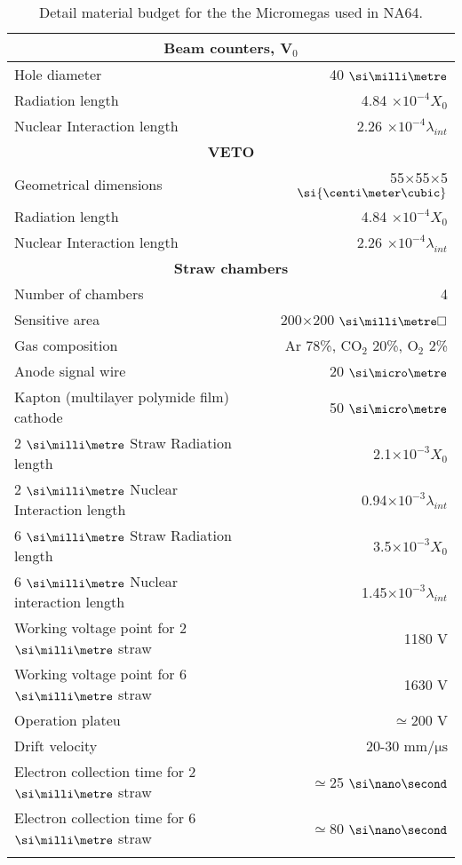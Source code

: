 \begin{longtable}{|l|r|}
  \hline
  \multicolumn{2}{|c|}{\textbf{Beam counters, V$_0$}}\\
  \hline
  Hole diameter & 40 $\mmi$ \\
  Radiation length & 4.84 $\times10^{-4} X_0$ \\
  Nuclear Interaction length & 2.26 $\times 10^{-4} \lambda_{int}$ \\
  \hline
  \multicolumn{2}{|c|}{\textbf{VETO}}\\
  \hline
  Geometrical dimensions & 55$\times$55$\times$5 $\si{\centi\meter\cubic}$ \\
  Radiation length & 4.84 $\times10^{-4} X_0$ \\
  Nuclear Interaction length & 2.26 $\times 10^{-4} \lambda_{int}$ \\
  \hline
  \multicolumn{2}{|c|}{\textbf{Straw chambers}}\\
  \hline
  Number of chambers & 4 \\
  Sensitive area & 200$\times$200 $\mms$ \\
  Gas composition & Ar 78\%, CO$_2$ 20\%, O$_2$ 2\% \\
  Anode signal wire & 20 $\mum$ \\
  Kapton (multilayer polymide film) cathode & 50 $\mum$ \\
  2 $\mmi$ Straw Radiation length & 2.1$\times 10^{-3}X_0$ \\
  2 $\mmi$ Nuclear Interaction length & 0.94$\times 10^{-3}\lambda_{int}$ \\
  6 $\mmi$ Straw Radiation length & 3.5$\times 10^{-3}X_0$ \\
  6 $\mmi$ Nuclear interaction length & 1.45$\times 10^{-3}\lambda_{int}$ \\
  Working voltage point for 2 $\mmi$ straw & 1180 \si{\volt} \\
  Working voltage point for 6 $\mmi$ straw & 1630 \si{\volt} \\
  Operation plateu & $\simeq$200 \si{\volt} \\
  Drift velocity & 20-30 $\si{\milli\meter\per\micro\second}$ \\
  Electron collection time for 2 $\mmi$ straw & $\simeq$25 $\nas$ \\
  Electron collection time for 6 $\mmi$ straw & $\simeq$80 $\nas$ \\
               
  
  
  \hline
  \caption[sub-detectors description]{Detail material budget for the the Micromegas used in NA64.}
  \label{tab:detector-tables}
\end{longtable}


